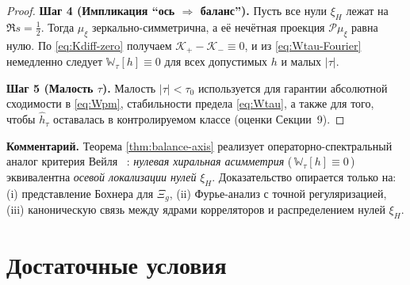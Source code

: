 \documentclass{article}
\numberwithin{equation}{section}
\theoremstyle{plain}
\theoremstyle{definition}
\theoremstyle{remark}
\def\Rightarrow{⇒}%
\begin{document}
\begin{proof}
\textbf{Шаг 4 (Импликация ``ось $\Rightarrow$ баланс'').}
Пусть все нули $\xi_H$ лежат на $\Re s=\tfrac12$.
Тогда $\mu_\xi$ зеркально-симметрична, а её нечётная проекция $\mathcal P\mu_\xi$ равна нулю.
По \eqref{eq:Kdiff-zero} получаем $\mathcal K_+-\mathcal K_-\equiv 0$, и из \eqref{eq:Wtau-Fourier} немедленно следует $\mathbb W_\tau[h]\equiv 0$ для всех допустимых $h$ и малых $|\tau|$.

\textbf{Шаг 5 (Малость $\tau$).}
Малость $|\tau|<\tau_0$ используется для гарантии абсолютной сходимости в \eqref{eq:Wpm}, стабильности предела \eqref{eq:Wtau}, а также для того, чтобы $\widehat h_\tau$ оставалась в контролируемом классе (оценки Секции~9).
\end{proof}


\noindent
\textbf{Комментарий.}
Теорема \ref{thm:balance-axis} реализует операторно-спектральный аналог критерия Вейля ~\cite{Weil1952}:
\emph{нулевая хиральная асимметрия} (\,$\mathbb W_\tau[h]\equiv 0$\,) эквивалентна \emph{осевой локализации нулей} $\xi_H$.
Доказательство опирается только на: (i) представление Бохнера для $\Xi_g$, (ii) Фурье-анализ с точной регуляризацией, (iii) каноническую связь между ядрами корреляторов и распределением нулей $\xi_H$.

\clearpage

\section{Достаточные условия}
\end{document}
